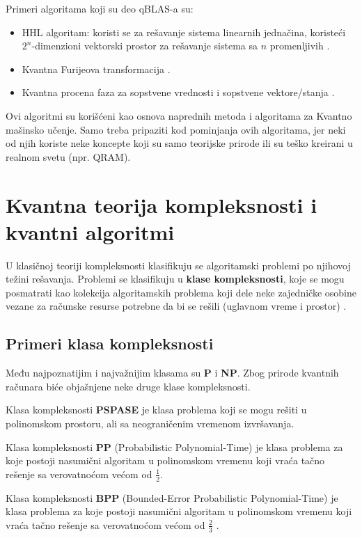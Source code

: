 \documentclass[12pt, letterpaper, oneside]{article}
\begin{document}
Primeri algoritama koji su deo qBLAS-a su: 
\begin{itemize}
    \item HHL algoritam: koristi se za rešavanje sistema linearnih jednačina, koristeći $2^n$-dimenzioni vektorski prostor
        za rešavanje sistema sa $n$ promenljivih \cite{Quantum_machine_learning}.
    \item Kvantna Furijeova transformacija \cite{Classical&quantum_info_Fourie_Phase}.
    \item Kvantna procena faza za sopstvene vrednosti i sopstvene vektore/stanja \cite{Classical&quantum_info_Fourie_Phase}.
\end{itemize}
Ovi algoritmi su korišćeni kao osnova naprednih metoda i algoritama za Kvantno mašinsko učenje.
Samo treba pripaziti kod pominjanja ovih algoritama, jer neki od njih koriste neke koncepte koji su samo teorijske prirode ili su teško kreirani u realnom svetu (npr. QRAM).

\newpage
\section{Kvantna teorija kompleksnosti i kvantni algoritmi}
U klasičnoj teoriji kompleksnosti klasifikuju se algoritamski problemi po njihovoj težini rešavanja.
Problemi se klasifikuju u \textbf{klase kompleksnosti}, koje se mogu posmatrati kao kolekcija algoritamskih problema koji dele neke zajedničke osobine
vezane za računske resurse potrebne da bi se rešili (uglavnom vreme i prostor) \cite{nielsen_chuang_10th}.

\subsection{Primeri klasa kompleksnosti}
Među najpoznatijim i najvažnijim klasama su \textbf{P} i \textbf{NP}. Zbog prirode kvantnih računara biće objašnjene neke druge klase kompleksnosti.

Klasa kompleksnosti \textbf{PSPASE} je klasa problema koji se mogu rešiti u polinomskom prostoru, ali sa neograničenim vremenom izvršavanja.


Klasa kompleksnosti \textbf{PP} (Probabilistic Polynomial-Time) je klasa problema za koje postoji nasumični algoritam u polinomskom vremenu koji vraća
tačno rešenje sa verovatnoćom većom od $\frac{1}{2}$.

Klasa kompleksnosti \textbf{BPP} (Bounded-Error Probabilistic Polynomial-Time) je klasa problema za koje postoji nasumični algoritam u polinomskom vremenu koji vraća
tačno rešenje sa verovatnoćom većom od $\frac{2}{3}$ \cite{aaronson2013quantum}.
\end{document}
